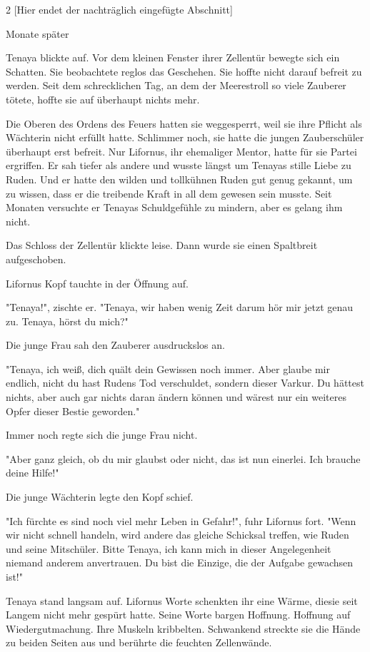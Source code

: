 \documentclass[10pt, a4paper, oneside]{book}
\begin{document}
\begin{multicols}{2}
[Hier endet der nachträglich eingefügte Abschnitt]\bigskip

Monate später

Tenaya blickte auf. Vor dem kleinen Fenster ihrer Zellentür bewegte sich ein Schatten. Sie beobachtete reglos das Geschehen. Sie hoffte nicht darauf befreit zu werden. Seit dem schrecklichen Tag, an dem der Meerestroll so viele Zauberer tötete, hoffte sie auf überhaupt nichts mehr.

Die Oberen des Ordens des Feuers hatten sie weggesperrt, weil sie ihre Pflicht als Wächterin nicht erfüllt hatte. Schlimmer noch, sie hatte die jungen Zauberschüler überhaupt erst befreit. Nur Lifornus, ihr ehemaliger Mentor, hatte für sie Partei ergriffen. Er sah tiefer als andere und wusste längst um Tenayas stille Liebe zu Ruden. Und er hatte den wilden und tollkühnen Ruden gut genug gekannt, um zu wissen, dass er die treibende Kraft in all dem gewesen sein musste. Seit Monaten versuchte er Tenayas Schuldgefühle zu mindern, aber es gelang ihm nicht.

Das Schloss der Zellentür klickte leise. Dann wurde sie einen Spaltbreit aufgeschoben.

Lifornus Kopf tauchte in der Öffnung auf.

"Tenaya!", zischte er. "Tenaya, wir haben wenig Zeit darum hör mir jetzt genau zu. Tenaya, hörst du mich?"

Die junge Frau sah den Zauberer ausdruckslos an.

"Tenaya, ich weiß, dich quält dein Gewissen noch immer. Aber glaube mir endlich, nicht du hast Rudens Tod verschuldet, sondern dieser Varkur. Du hättest nichts, aber auch gar nichts daran ändern können und wärest nur ein weiteres Opfer dieser Bestie geworden."

Immer noch regte sich die junge Frau nicht.

"Aber ganz gleich, ob du mir glaubst oder nicht, das ist nun einerlei. Ich brauche deine Hilfe!"

Die junge Wächterin legte den Kopf schief.

"Ich fürchte es sind noch viel mehr Leben in Gefahr!", fuhr Lifornus fort. "Wenn wir nicht schnell handeln, wird andere das gleiche Schicksal treffen, wie Ruden und seine Mitschüler. Bitte Tenaya, ich kann mich in dieser Angelegenheit niemand anderem anvertrauen. Du bist die Einzige, die der Aufgabe gewachsen ist!"

Tenaya stand langsam auf. Lifornus Worte schenkten ihr eine Wärme, diesie seit Langem nicht mehr gespürt hatte. Seine Worte bargen Hoffnung. Hoffnung auf Wiedergutmachung. Ihre Muskeln kribbelten. Schwankend streckte sie die Hände zu beiden Seiten aus und berührte die feuchten Zellenwände.


\end{multicols}
\end{document}
